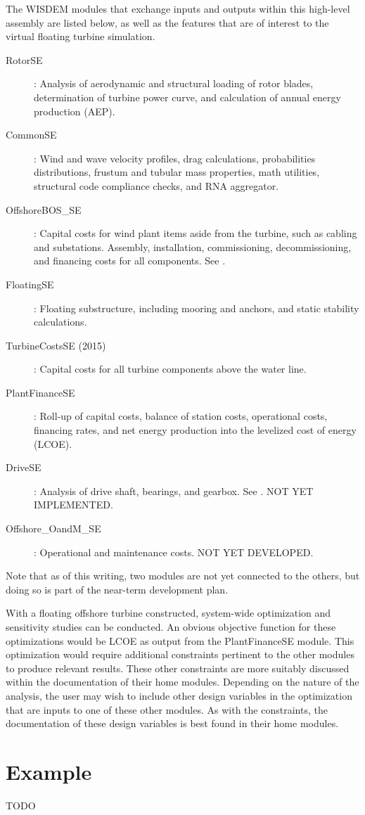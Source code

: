The WISDEM modules that exchange inputs and outputs within this
high-level assembly are listed below, as well as the features that are
of interest to the virtual floating turbine simulation.
\begin{description}
\item[RotorSE]: Analysis of aerodynamic and structural loading of rotor
  blades, determination of turbine power curve, and calculation of
  annual energy production (AEP).
\item[CommonSE]: Wind and wave velocity profiles, drag calculations,
  probabilities distributions, frustum and tubular mass properties, math
  utilities, structural code compliance checks, and RNA aggregator.
\item[OffshoreBOS\_SE]: Capital costs for wind plant items aside from the
  turbine, such as cabling and substations.  Assembly, installation,
  commissioning, decommissioning, and financing costs for all
  components. See \citep{obos}.
\item[FloatingSE]: Floating substructure, including mooring and anchors, and
  static stability calculations.
\item[TurbineCostsSE (2015)]: Capital costs for all turbine components
  above the water line.
\item[PlantFinanceSE]: Roll-up of capital costs, balance of station
  costs, operational costs, financing rates, and net energy production
  into the levelized cost of energy (LCOE).
\item[DriveSE]: Analysis of drive shaft, bearings, and gearbox.  See
  \citep{DriveSE}. NOT YET IMPLEMENTED.
\item[Offshore\_OandM\_SE]: Operational and maintenance costs.  NOT YET
    DEVELOPED.
\end{description}
Note that as of this writing, two modules are not yet connected to the
others, but doing so is part of the near-term development plan.

With a floating offshore turbine constructed, system-wide optimization
and sensitivity studies can be conducted.  An obvious objective function
for these optimizations would be LCOE as output from the PlantFinanceSE
module.  This optimization would require additional constraints
pertinent to the other modules to produce relevant results.  These other
constraints are more suitably discussed within the documentation of
their home modules.  Depending on the nature of the analysis, the user
may wish to include other design variables in the optimization that are
inputs to one of these other modules.  As with the constraints, the
documentation of these design variables is best found in their home
modules.

\section{Example}
TODO
